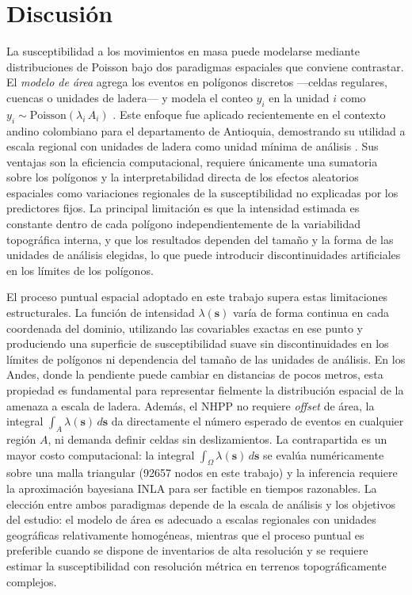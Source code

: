 \documentclass[12pt, a4paper]{article}
\begin{document}
\section{Discusión}
\label{sec:discussion}

La susceptibilidad a los movimientos en masa puede modelarse mediante
distribuciones de Poisson bajo dos paradigmas espaciales que conviene contrastar.
El \emph{modelo de área} agrega los eventos en polígonos discretos ---celdas
regulares, cuencas o unidades de ladera--- y modela el conteo $y_i$ en la unidad
$i$ como $y_i \sim \text{Poisson}(\lambda_i\,A_i)$
\citep{aristizabal2025ag}. Este enfoque fue aplicado recientemente en el contexto
andino colombiano para el departamento de Antioquia, demostrando su utilidad a
escala regional con unidades de ladera como unidad mínima de análisis
\citep{aristizabal2025ag}. Sus ventajas son la eficiencia computacional, requiere
únicamente una sumatoria sobre los polígonos y la interpretabilidad directa de los efectos
aleatorios espaciales como variaciones regionales de la susceptibilidad no explicadas
por los predictores fijos. La principal limitación es que la intensidad estimada es
constante dentro de cada polígono independientemente de la variabilidad topográfica
interna, y que los resultados dependen del tamaño y la forma de las unidades de
análisis elegidas, lo que puede
introducir discontinuidades artificiales en los límites de los polígonos.

El proceso puntual espacial adoptado en este trabajo supera estas limitaciones
estructurales. La función de intensidad $\lambda(\mathbf{s})$ varía de forma continua
en cada coordenada del dominio, utilizando las covariables exactas en ese punto y
produciendo una superficie de susceptibilidad suave sin discontinuidades en los
límites de polígonos ni dependencia del tamaño de las unidades de análisis. En los
Andes, donde la pendiente puede cambiar en distancias
de pocos metros, esta propiedad es fundamental para representar fielmente la
distribución espacial de la amenaza a escala de ladera. Además, el NHPP no requiere
\emph{offset} de área, la integral $\int_A \lambda(\mathbf{s})\,d\mathbf{s}$ da
directamente el número esperado de eventos en cualquier región $A$, ni demanda
definir celdas sin deslizamientos. La contrapartida es un mayor
costo computacional: la integral $\int_\Omega \lambda(\mathbf{s})\,d\mathbf{s}$ se
evalúa numéricamente sobre una malla triangular (\num{92657} nodos en este trabajo)
y la inferencia requiere la aproximación bayesiana INLA para ser factible en tiempos
razonables. La elección entre ambos paradigmas depende de la escala de análisis y
los objetivos del estudio: el modelo de área es adecuado a escalas regionales con
unidades geográficas relativamente homogéneas, mientras que el proceso puntual es
preferible cuando se dispone de inventarios de alta resolución y se requiere estimar
la susceptibilidad con resolución métrica en terrenos topográficamente complejos.
\end{document}
